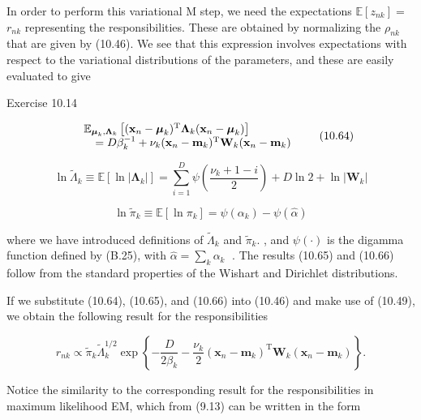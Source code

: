 \documentclass[
  10
]{article}
\begin{document}
In order to perform this variational M step, we need the expectations
\(\mathbb { E } [ z _ { n k } ] =\) \(r _ { n k }\) representing the
responsibilities. These are obtained by normalizing the
\(\rho _ { n k }\) that are given by (10.46). We see that this
expression involves expectations with respect to the variational
distributions of the parameters, and these are easily evaluated to give

Exercise 10.14

\[
\begin{array}{r l} & {\mathbb {E} _ {\boldsymbol {\mu} _ {k}, \boldsymbol {\Lambda} _ {k}} \left[ (\mathbf {x} _ {n} - \boldsymbol {\mu} _ {k}) ^ {\mathrm{T}} \boldsymbol {\Lambda} _ {k} (\mathbf {x} _ {n} - \boldsymbol {\mu} _ {k}) \right]} \\ & {\quad = D \beta_ {k} ^ {- 1} + \nu_ {k} (\mathbf {x} _ {n} - \mathbf {m} _ {k}) ^ {\mathrm{T}} \mathbf {W} _ {k} (\mathbf {x} _ {n} - \mathbf {m} _ {k})} \end{array}\tag{10.64}
\]

\[
\ln \widetilde {\Lambda} _ {k} \equiv \mathbb {E} \left[ \ln | \boldsymbol {\Lambda} _ {k} | \right] = \sum_ {i = 1} ^ {D} \psi \left(\frac {\nu_ {k} + 1 - i}{2}\right) + D \ln 2 + \ln | \mathbf {W} _ {k} |\tag{10.65}
\]

\[
\ln \widetilde {\pi} _ {k} \equiv \mathbb {E} \left[ \ln \pi_ {k} \right] = \psi (\alpha_ {k}) - \psi (\widehat {\alpha})\tag{10.66}
\]

where we have introduced definitions of
\(\widetilde { \Lambda } _ { k }\) and \(\widetilde { \pi } _ { k } .\)
, and \(\psi ( \cdot )\) is the digamma function defined by (B.25), with
\(\widehat { \alpha } = \textstyle \sum _ { k } \alpha _ { k }\) . The
results (10.65) and (10.66) follow from the standard properties of the
Wishart and Dirichlet distributions.

If we substitute (10.64), (10.65), and (10.66) into (10.46) and make use
of (10.49), we obtain the following result for the responsibilities

\[
r _ {n k} \propto \widetilde {\pi} _ {k} \widetilde {\Lambda} _ {k} ^ {1 / 2} \exp \left\{- \frac {D}{2 \beta_ {k}} - \frac {\nu_ {k}}{2} (\mathbf {x} _ {n} - \mathbf {m} _ {k}) ^ {\mathrm{T}} \mathbf {W} _ {k} (\mathbf {x} _ {n} - \mathbf {m} _ {k}) \right\}.\tag{10.67}
\]

Notice the similarity to the corresponding result for the
responsibilities in maximum likelihood EM, which from (9.13) can be
written in the form
\end{document}
